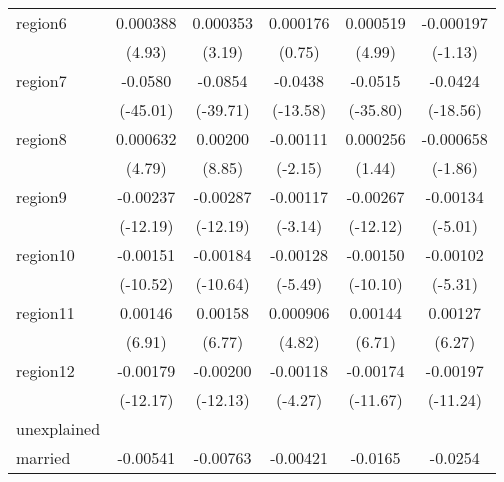 \begin{table}[htbp]
\begin{tabular}{l*{5}{c}}
region6     &    0.000388\sym{***}&    0.000353\sym{**} &    0.000176         &    0.000519\sym{***}&   -0.000197         \\
            &      (4.93)         &      (3.19)         &      (0.75)         &      (4.99)         &     (-1.13)         \\
region7     &     -0.0580\sym{***}&     -0.0854\sym{***}&     -0.0438\sym{***}&     -0.0515\sym{***}&     -0.0424\sym{***}\\
            &    (-45.01)         &    (-39.71)         &    (-13.58)         &    (-35.80)         &    (-18.56)         \\
region8     &    0.000632\sym{***}&     0.00200\sym{***}&    -0.00111\sym{*}  &    0.000256         &   -0.000658         \\
            &      (4.79)         &      (8.85)         &     (-2.15)         &      (1.44)         &     (-1.86)         \\
region9     &    -0.00237\sym{***}&    -0.00287\sym{***}&    -0.00117\sym{**} &    -0.00267\sym{***}&    -0.00134\sym{***}\\
            &    (-12.19)         &    (-12.19)         &     (-3.14)         &    (-12.12)         &     (-5.01)         \\
region10    &    -0.00151\sym{***}&    -0.00184\sym{***}&    -0.00128\sym{***}&    -0.00150\sym{***}&    -0.00102\sym{***}\\
            &    (-10.52)         &    (-10.64)         &     (-5.49)         &    (-10.10)         &     (-5.31)         \\
region11    &     0.00146\sym{***}&     0.00158\sym{***}&    0.000906\sym{***}&     0.00144\sym{***}&     0.00127\sym{***}\\
            &      (6.91)         &      (6.77)         &      (4.82)         &      (6.71)         &      (6.27)         \\
region12    &    -0.00179\sym{***}&    -0.00200\sym{***}&    -0.00118\sym{***}&    -0.00174\sym{***}&    -0.00197\sym{***}\\
            &    (-12.17)         &    (-12.13)         &     (-4.27)         &    (-11.67)         &    (-11.24)         \\
\hline
unexplained &                     &                     &                     &                     &                     \\
married     &    -0.00541         &    -0.00763         &    -0.00421         &     -0.0165         &     -0.0254\sym{*}  \\

\end{tabular}
\end{table}
